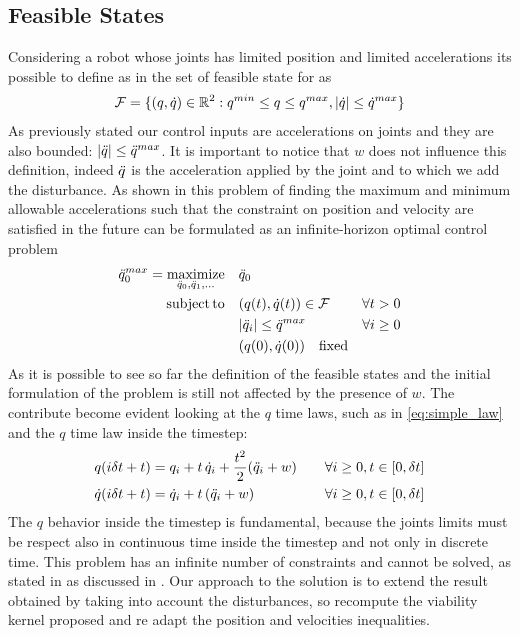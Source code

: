 \documentclass{article}
\begin{document}
\subsection{Feasible States}
Considering a robot whose joints has limited position and limited accelerations its possible to define as in \cite{DelPrete2018} the set of feasible state for as 
\begin{equation}
    \begin{aligned} 
        \mathcal{F} = \{ (q,\dot{q}) \in \mathbb{R}^{2} : q^{min} \le q \le q^{max}, |\dot{q} | \le \dot{q}^{max} \}
    \end{aligned}
\end{equation}
As previously stated our control inputs are accelerations on joints and they are also bounded: $|\ddot{q}|\leq\ddot{q}^{max}$. It is important to notice that $w$ does not influence this definition, indeed $\ddot{q}$ is the acceleration applied by the joint and to which we add the disturbance. 
 As shown in \cite{DelPrete2018} this problem of finding the maximum and minimum allowable accelerations such that the constraint on position and velocity are satisfied in the future can be formulated as an infinite-horizon optimal control problem 
 \begin{equation} \label{eq:original_problem} \begin{aligned} 
     \ddot{q}_0^{max} = \operatorname*{maximize}_{\ddot{q}_0, \ddot{q}_1, \dots} \quad & \ddot{q}_0 & \\
     \operatorname*{subject\,to} \quad & (q(t), \dot{q}(t)) \in \mathcal{F}			& \forall t > 0\\
     & |\ddot{q}_i | \le \ddot{q}^{max}  						& \forall i \ge 0\\
     & (q(0), \dot{q}(0)) \quad \text{fixed}
     \end{aligned} 
 \end{equation}
As it is possible to see so far the definition of the feasible states and the initial formulation of the problem is still not affected by the presence of $w$. The contribute become evident looking at the $q$ time laws, such as in \ref{eq:simple_law} and the $q$ time law inside the timestep:
\begin{equation} \begin{aligned} 
    q(i \delta t + t) &= q_i + t \, \dot{q}_i + \frac{t^2}{2} (\ddot{q}_i+w) 	\quad & \forall i \ge 0, t \in [0, \delta t] \\
    \dot{q}(i \delta t + t) &= \dot{q}_i + t \, (\ddot{q}_i+w)     				\quad & \forall i \ge 0, t \in [0, \delta t]
    \end{aligned} 
    \end{equation}
The $q$ behavior inside the timestep is fundamental, because the joints limits must be respect also in continuous time inside the timestep and not only in discrete time. This problem has an infinite number of constraints and cannot be solved, as stated in as discussed in \cite{DelPrete2018}. Our approach to the solution is to extend the result obtained by \cite{DelPrete2018} taking into account the disturbances, so recompute the viability kernel proposed and re adapt the position and velocities inequalities.
\end{document}
